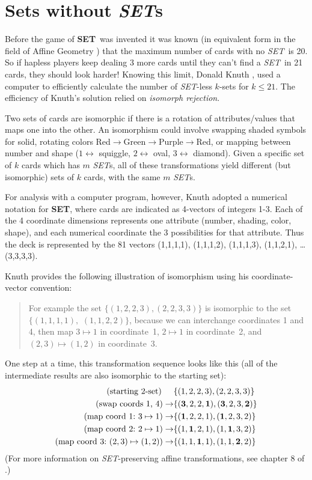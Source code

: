 \documentclass{article}
\newcommand{\SET}{{\em SET}}
\newcommand{\SETs}{{\em SET}s}
\newcommand{\SETg}{{\bf SET}}
\begin{document}
\section{Sets without \SETs}
Before the game of \SETg~was invented it was known (in equivalent form in the
field of Affine Geometry \cite{MAXCAP}) that the maximum number of cards with no
\SET~is 20. So if hapless players keep dealing 3 more cards until they can't
find a \SET~in 21 cards, they should look harder!  Knowing this limit, Donald
Knuth \cite{SETSET}, \cite{SETSET-ALL} used a computer to efficiently calculate
the number of \SET-less $k$-sets for $k\leq 21$. The efficiency of Knuth's
solution relied on {\em isomorph rejection}. 

Two sets of cards are isomorphic if there is a rotation of attributes/values
that maps one into the other. An isomorphism could involve swapping shaded
symbols for solid, rotating colors
Red$\rightarrow$Green$\rightarrow$Purple$\rightarrow$Red, or mapping between
number and shape ($1\leftrightarrow$ squiggle, $2\leftrightarrow$ oval,
$3\leftrightarrow$ diamond). Given a specific set of $k$ cards which has $m$
\SETs, all of these transformations yield different (but isomorphic) sets of $k$
cards, with the same $m$ \SETs.

For analysis with a computer program, however, Knuth adopted a numerical
notation for \SETg, where cards are indicated as 4-vectors of integers 1-3. Each
of the 4 coordinate dimensions represents one attribute (number, shading, color,
shape), and each numerical coordinate the 3 possibilities for that
attribute. Thus the deck is represented by the 81 vectors (1,1,1,1), (1,1,1,2),
(1,1,1,3), (1,1,2,1), \ldots (3,3,3,3).

Knuth provides the following illustration of isomorphism using his
coordinate-vector convention:
\begin{quotation}For example the set $\{(1,2,2,3), (2,2,3,3)\}$ is
  isomorphic to the set $\{(1,1,1,1),$ $(1,1,2,2)\}$, because we can interchange
  coordinates 1 and 4, then map $3\mapsto 1$ in coordinate~1, $2\mapsto1$ in
  coordinate~2, and $(2,3)\mapsto(1,2)$ in coordinate~3.
\end{quotation}
One step at a time, this transformation sequence looks like this (all of the
intermediate results are also isomorphic to the starting set):
\begin{align*}
(\text{starting 2-set)\hspace{5mm}}&  \{(1,2,2,3), (2,2,3,3)\}  \\
  (\text{swap coords 1, 4})  \rightarrow & \{(\mathbf{3},2,2,\mathbf{1}), (\mathbf{3},2,3,\mathbf{2})\} \\
  (\text{map coord 1:~} 3\mapsto 1)\rightarrow & \{(\mathbf{1},2,2,1), (\mathbf{1},2,3,2)\} \\
  (\text{map coord 2:~} 2\mapsto 1)\rightarrow & \{(1,\mathbf{1},2,1), (1,\mathbf{1},3,2)\} \\
  (\text{map coord 3:~} (2,3)\mapsto(1,2))\rightarrow & \{(1,1,\mathbf{1},1), (1,1,\mathbf{2},2)\}
\end{align*}
(For more information on \SET-preserving affine transformations, see chapter 8
of \cite{JOS}.)
\end{document}
